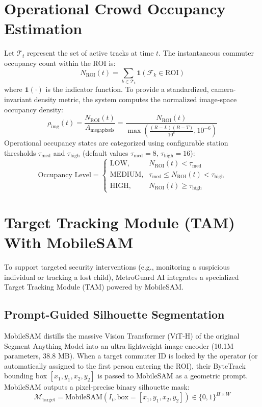 \documentclass[12pt,a4paper]{report}
\begin{document}
\section{Operational Crowd Occupancy Estimation}
Let $\mathcal{T}_t$ represent the set of active tracks at time $t$. The instantaneous commuter occupancy count within the ROI is:
\begin{equation}
    N_{\text{ROI}}(t) = \sum_{k \in \mathcal{T}_t} \mathbf{1}\left( \mathcal{F}_k \in \text{ROI} \right)
\end{equation}
where $\mathbf{1}(\cdot)$ is the indicator function. To provide a standardized, camera-invariant density metric, the system computes the normalized image-space occupancy density:
\begin{equation}
    \rho_{\text{img}}(t) = \frac{N_{\text{ROI}}(t)}{A_{\text{megapixels}}} = \frac{N_{\text{ROI}}(t)}{\max\left( \frac{(R - L)(B - T)}{10^6}, 10^{-6} \right)}
\end{equation}
Operational occupancy states are categorized using configurable station thresholds $\tau_{\text{med}}$ and $\tau_{\text{high}}$ (default values $\tau_{\text{med}} = 8$, $\tau_{\text{high}} = 16$):
\begin{equation}
    \text{Occupancy Level} = \begin{cases}
        \text{LOW}, & N_{\text{ROI}}(t) < \tau_{\text{med}} \\
        \text{MEDIUM}, & \tau_{\text{med}} \le N_{\text{ROI}}(t) < \tau_{\text{high}} \\
        \text{HIGH}, & N_{\text{ROI}}(t) \ge \tau_{\text{high}}
    \end{cases}
\end{equation}

\section{Target Tracking Module (TAM) With MobileSAM}
To support targeted security interventions (e.g., monitoring a suspicious individual or tracking a lost child), MetroGuard AI integrates a specialized Target Tracking Module (TAM) powered by MobileSAM.

\subsection{Prompt-Guided Silhouette Segmentation}
MobileSAM distills the massive Vision Transformer (ViT-H) of the original Segment Anything Model into an ultra-lightweight image encoder (10.1M parameters, 38.8 MB). When a target commuter ID is locked by the operator (or automatically assigned to the first person entering the ROI), their ByteTrack bounding box $[x_1, y_1, x_2, y_2]$ is passed to MobileSAM as a geometric prompt. MobileSAM outputs a pixel-precise binary silhouette mask:
\begin{equation}
    \mathcal{M}_{\text{target}} = \text{MobileSAM}\left( I_t, \text{box}=[x_1, y_1, x_2, y_2] \right) \in \{0, 1\}^{H \times W}
\end{equation}
\end{document}
